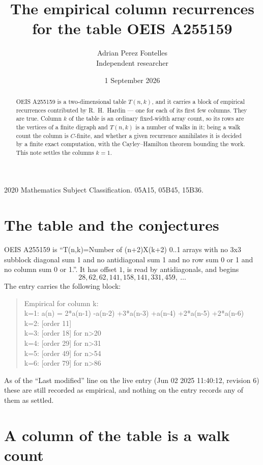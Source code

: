 \documentclass[11pt,a4paper]{article}
\title{The empirical column recurrences for the table OEIS A255159}
\author{Adrian Perez Fontelles\\ \small Independent researcher}
\date{1 September 2026}
\theoremstyle{plain}
\theoremstyle{definition}
\begin{document}
\maketitle

\begin{abstract}
OEIS A255159 is a two-dimensional table $T(n,k)$, and it carries a block of empirical
recurrences contributed by R.~H.~Hardin --- one for each of its first few columns. They are
true. Column $k$ of the table is an ordinary fixed-width array count, so its rows are the
vertices of a finite digraph and $T(n,k)$ is a number of walks in it; being a walk count the
column is $C$-finite, and whether a given recurrence annihilates it is decided by a finite
exact computation, with the Cayley--Hamilton theorem bounding the work. This note settles the columns $k=1$.
\end{abstract}

\noindent\small 2020 Mathematics Subject Classification. 05A15, 05B45, 15B36.\normalsize

\section{The table and the conjectures}

OEIS A255159 is ``T(n,k)=Number of (n+2)X(k+2) 0..1 arrays with no 3x3 subblock diagonal sum 1 and no antidiagonal sum 1 and no row sum 0 or 1 and no column sum 0 or 1.''. It has offset $1$, is
read by antidiagonals, and begins
\[
28, 62, 62, 141, 158, 141, 331, 459,\ \dots
\]
The entry carries the following block:
\begin{quote}\small
Empirical for column k:\\
k=1: a(n) = 2*a(n-1) -a(n-2) +3*a(n-3) +a(n-4) +2*a(n-5) +2*a(n-6)\\
k=2: [order 11]\\
k=3: [order 18] for n>20\\
k=4: [order 29] for n>31\\
k=5: [order 49] for n>54\\
k=6: [order 79] for n>86\\
\end{quote}
As of the ``Last modified'' line on the live entry (Jun 02 2025 11:40:12, revision 6) these are still
recorded as empirical, and nothing on the entry records any of them as settled.

\section{A column of the table is a walk count}
\end{document}
